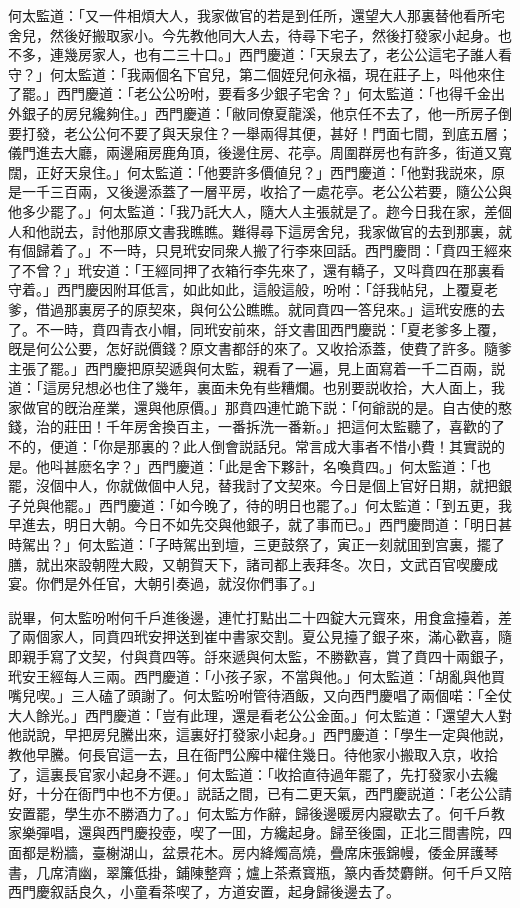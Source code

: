何太監道：「又一件相煩大人，我家做官的若是到任所，還望大人那裏替他看所宅舍兒，然後好搬取家小。今先教他同大人去，待尋下宅子，然後打發家小起身。也不多，連幾房家人，也有二三十口。」西門慶道：「天泉去了，老公公這宅子誰人看守？」何太監道：「我兩個名下官兒，第二個姪兒何永福，現在莊子上，呌他來住了罷。」西門慶道：「老公公吩咐，要看多少銀子宅舍？」何太監道：「也得千金出外銀子的房兒纔夠住。」西門慶道：「敝同僚夏龍溪，他京任不去了，他一所房子倒要打發，老公公何不要了與天泉住？一舉兩得其便，甚好！門面七間，到底五層；儀門進去大廳，兩邊廂房鹿角頂，後邊住房、花亭。周圍群房也有許多，街道又寬闊，正好天泉住。」何太監道：「他要許多價値兒？」西門慶道：「他對我説來，原是一千三百兩，又後邊添蓋了一層平房，收拾了一處花亭。老公公若要，隨公公與他多少罷了。」何太監道：「我乃託大人，隨大人主張就是了。趂今日我在家，差個人和他説去，討他那原文書我瞧瞧。難得尋下這房舍兒，我家做官的去到那裏，就有個歸着了。」不一時，只見玳安同衆人搬了行李來回話。西門慶問：「賁四王經來了不曾？」玳安道：「王經同押了衣箱行李先來了，還有轎子，又呌賁四在那裏看守着。」西門慶因附耳低言，如此如此，這般這般，吩咐：「㧱我帖兒，上覆夏老爹，借過那裏房子的原契來，與何公公瞧瞧。就同賁四一答兒來。」這玳安應的去了。不一時，賁四青衣小帽，同玳安前來，㧱文書囬西門慶説：「夏老爹多上覆，旣是何公公要，怎好説價錢？原文書都㧱的來了。又收拾添蓋，使費了許多。隨爹主張了罷。」西門慶把原契遞與何太監，親看了一遍，見上面寫着一千二百兩，説道：「這房兒想必也住了幾年，裏面未免有些糟爛。也别要説收拾，大人面上，我家做官的旣治産業，還與他原價。」那賁四連忙跪下説：「何爺説的是。自古使的憨錢，治的莊田！千年房舍換百主，一番拆洗一番新。」把這何太監聽了，喜歡的了不的，便道：「你是那裏的？此人倒會説話兒。常言成大事者不惜小費！其實説的是。他呌甚麽名字？」西門慶道：「此是舍下夥計，名喚賁四。」何太監道：「也罷，沒個中人，你就做個中人兒，替我討了文契來。今日是個上官好日期，就把銀子兑與他罷。」西門慶道：「如今晚了，待的明日也罷了。」何太監道：「到五更，我早進去，明日大朝。今日不如先交與他銀子，就了事而已。」西門慶問道：「明日甚時駕出？」何太監道：「子時駕出到壇，三更鼓祭了，寅正一刻就囬到宫裏，擺了膳，就出來設朝陞大殿，又朝賀天下，諸司都上表拜冬。次日，文武百官喫慶成宴。你們是外任官，大朝引奏過，就沒你們事了。」

説畢，何太監吩咐何千戶進後邊，連忙打點出二十四錠大元寳來，用食盒擡着，差了兩個家人，同賁四玳安押送到崔中書家交割。夏公見擡了銀子來，滿心歡喜，隨即親手寫了文契，付與賁四等。㧱來遞與何太監，不勝歡喜，賞了賁四十兩銀子，玳安王經每人三兩。西門慶道：「小孩子家，不當與他。」何太監道：「胡亂與他買嘴兒喫。」三人磕了頭謝了。何太監吩咐管待酒飯，又向西門慶唱了兩個喏：「全仗大人餘光。」西門慶道：「豈有此理，還是看老公公金面。」何太監道：「還望大人對他説說，早把房兒騰出來，這裏好打發家小起身。」西門慶道：「學生一定與他説，教他早騰。何長官這一去，且在衙門公廨中權住幾日。待他家小搬取入京，收拾了，這裏長官家小起身不遲。」何太監道：「收拾直待過年罷了，先打發家小去纔好，十分在衙門中也不方便。」説話之間，已有二更天氣，西門慶説道：「老公公請安置罷，學生亦不勝酒力了。」何太監方作辭，歸後邊暖房内寢歇去了。何千戶教家樂彈唱，還與西門慶投壺，喫了一囬，方纔起身。歸至後園，正北三間書院，四面都是粉牆，臺榭湖山，盆景花木。房内絳燭高燒，疊席床張錦幔，倭金屏護琴書，几席清幽，翠簾低掛，鋪陳整齊；爐上茶煮寳瓶，篆内香焚麝餅。何千戶又陪西門慶叙話良久，小童看茶喫了，方道安置，起身歸後邊去了。

